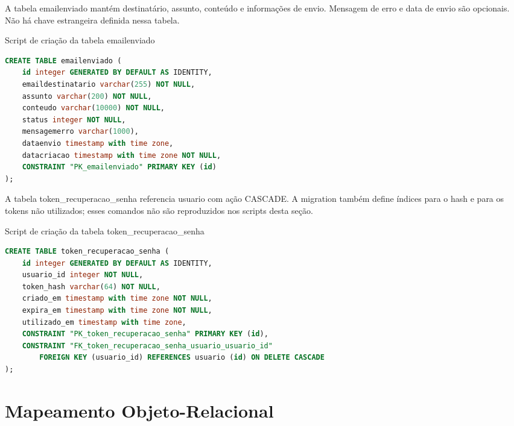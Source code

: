 A tabela emailenviado mantém destinatário, assunto, conteúdo e informações de envio. Mensagem de erro e data de envio são opcionais. Não há chave estrangeira definida nessa tabela.

\begin{quadro}[H]
\caption{Script de criação da tabela emailenviado}\label{qua:bd-emailenviado}
\begin{lstlisting}[language=SQL,breaklines=true,breakatwhitespace=false,frame=single,columns=fullflexible,basicstyle=\ttfamily\footnotesize]
CREATE TABLE emailenviado (
    id integer GENERATED BY DEFAULT AS IDENTITY,
    emaildestinatario varchar(255) NOT NULL,
    assunto varchar(200) NOT NULL,
    conteudo varchar(10000) NOT NULL,
    status integer NOT NULL,
    mensagemerro varchar(1000),
    dataenvio timestamp with time zone,
    datacriacao timestamp with time zone NOT NULL,
    CONSTRAINT "PK_emailenviado" PRIMARY KEY (id)
);
\end{lstlisting}
\end{quadro}

A tabela token\_recuperacao\_senha referencia usuario com ação CASCADE. A migration também define índices para o hash e para os tokens não utilizados; esses comandos não são reproduzidos nos scripts desta seção.

\begin{quadro}[H]
\caption{Script de criação da tabela token\_recuperacao\_senha}\label{qua:bd-token}
\begin{lstlisting}[language=SQL,breaklines=true,breakatwhitespace=false,frame=single,columns=fullflexible,basicstyle=\ttfamily\footnotesize]
CREATE TABLE token_recuperacao_senha (
    id integer GENERATED BY DEFAULT AS IDENTITY,
    usuario_id integer NOT NULL,
    token_hash varchar(64) NOT NULL,
    criado_em timestamp with time zone NOT NULL,
    expira_em timestamp with time zone NOT NULL,
    utilizado_em timestamp with time zone,
    CONSTRAINT "PK_token_recuperacao_senha" PRIMARY KEY (id),
    CONSTRAINT "FK_token_recuperacao_senha_usuario_usuario_id"
        FOREIGN KEY (usuario_id) REFERENCES usuario (id) ON DELETE CASCADE
);
\end{lstlisting}
\end{quadro}

\section{Mapeamento Objeto-Relacional}

